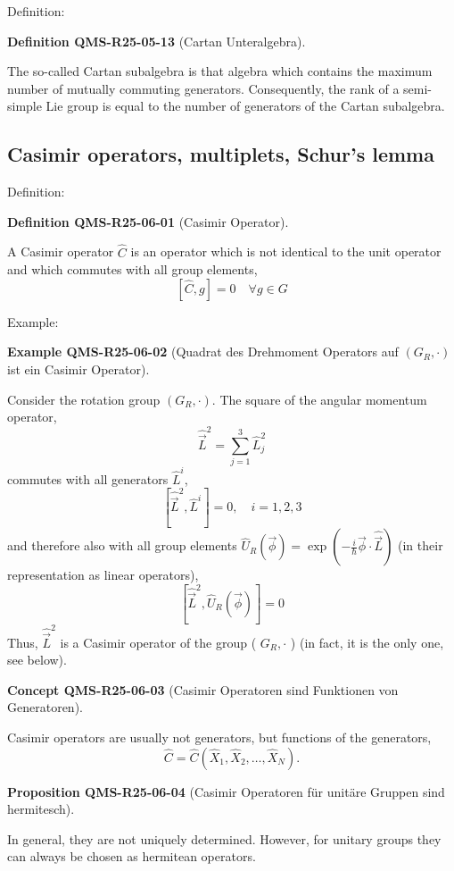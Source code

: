 \documentclass[10pt, letterpaper]{article}
\newcommand{\CustomHeading}[3]{%
  \par\medskip\noindent%
  \textbf{#1 #2} \textnormal{(#3)}.\enskip%
}
\newenvironment{DEF}[2]{\begin{unitbox}\CustomHeading{Definition}{#1}{#2}}{\end{unitbox}}
\newenvironment{PROP}[2]{\begin{unitbox}\CustomHeading{Proposition}{#1}{#2}}{\end{unitbox}}
\newenvironment{EXA}[2]{\begin{unitbox}\CustomHeading{Example}{#1}{#2}}{\end{unitbox}}
\newenvironment{CONC}[2]{\begin{unitbox}\CustomHeading{Concept}{#1}{#2}}{\end{unitbox}}
\begin{document}
Definition: 


\begin{DEF}{QMS-R25-05-13}{Cartan Unteralgebra}
The so-called Cartan subalgebra is that algebra which contains the maximum number of mutually commuting generators. Consequently, the rank of a semi-simple Lie group is equal to the number of generators of the Cartan subalgebra.
\end{DEF}




\subsection{Casimir operators, multiplets, Schur's lemma}


Definition: 

\begin{DEF}{QMS-R25-06-01}{Casimir Operator}
A Casimir operator $\hat{C}$ is an operator which is not identical to the unit operator and which commutes with all group elements,
$$
[\hat{C}, g]=0 \quad \forall g \in G
$$
\end{DEF}



Example: 

\begin{EXA}{QMS-R25-06-02}{Quadrat des Drehmoment Operators auf $\left(G_{R}, \cdot\right)$ ist ein Casimir Operator}
Consider the rotation group $\left(G_{R}, \cdot\right)$. The square of the angular momentum operator, 
$$\hat{\vec{L}}^{2}=\sum_{j=1}^{3} \hat{L}_{j}^{2}$$ 
commutes with all generators $\hat{L}^{i}$,
$$
\left[\hat{\vec{L}}^{2}, \hat{L}^{i}\right]=0, \quad i=1,2,3
$$
and therefore also with all group elements $\hat{U}_{R}(\vec{\phi})=\exp \left(-\frac{i}{\hbar} \vec{\phi} \cdot \hat{\vec{L}}\right)$ (in their representation as linear operators),
$$
\left[\hat{\vec{L}}^{2}, \hat{U}_{R}(\vec{\phi})\right]=0
$$
Thus, $\hat{\vec{L}}^{2}$ is a Casimir operator of the group ( $G_{R}, \cdot$ ) (in fact, it is the only one, see below).
\end{EXA} 


\begin{CONC}{QMS-R25-06-03}{Casimir Operatoren sind Funktionen von Generatoren}
Casimir operators are usually not generators, but functions of the generators,
$$
\hat{C}=\hat{C}\left(\hat{X}_{1}, \hat{X}_{2}, \ldots, \hat{X}_{N}\right) .
$$
\end{CONC}



\begin{PROP}{QMS-R25-06-04}{Casimir Operatoren für unitäre Gruppen sind hermitesch}
In general, they are not uniquely determined. However, for unitary groups they can always be chosen as hermitean operators.
\end{PROP}
\end{document}
